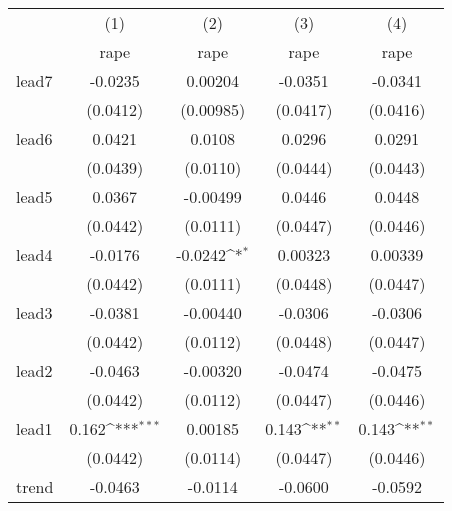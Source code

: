 {
\def\sym#1{\ifmmode^{#1}\else\(^{#1}\)\fi}
\begin{tabular}{l*{4}{c}}
\hline\hline
            &\multicolumn{1}{c}{(1)}&\multicolumn{1}{c}{(2)}&\multicolumn{1}{c}{(3)}&\multicolumn{1}{c}{(4)}\\
            &\multicolumn{1}{c}{rape}&\multicolumn{1}{c}{rape}&\multicolumn{1}{c}{rape}&\multicolumn{1}{c}{rape}\\
\hline
lead7       &     -0.0235         &     0.00204         &     -0.0351         &     -0.0341         \\
            &    (0.0412)         &   (0.00985)         &    (0.0417)         &    (0.0416)         \\
[1em]
lead6       &      0.0421         &      0.0108         &      0.0296         &      0.0291         \\
            &    (0.0439)         &    (0.0110)         &    (0.0444)         &    (0.0443)         \\
[1em]
lead5       &      0.0367         &    -0.00499         &      0.0446         &      0.0448         \\
            &    (0.0442)         &    (0.0111)         &    (0.0447)         &    (0.0446)         \\
[1em]
lead4       &     -0.0176         &     -0.0242\sym{*}  &     0.00323         &     0.00339         \\
            &    (0.0442)         &    (0.0111)         &    (0.0448)         &    (0.0447)         \\
[1em]
lead3       &     -0.0381         &    -0.00440         &     -0.0306         &     -0.0306         \\
            &    (0.0442)         &    (0.0112)         &    (0.0448)         &    (0.0447)         \\
[1em]
lead2       &     -0.0463         &    -0.00320         &     -0.0474         &     -0.0475         \\
            &    (0.0442)         &    (0.0112)         &    (0.0447)         &    (0.0446)         \\
[1em]
lead1       &       0.162\sym{***}&     0.00185         &       0.143\sym{**} &       0.143\sym{**} \\
            &    (0.0442)         &    (0.0114)         &    (0.0447)         &    (0.0446)         \\
[1em]
trend       &     -0.0463         &     -0.0114         &     -0.0600         &     -0.0592         \\

\end{tabular}}
